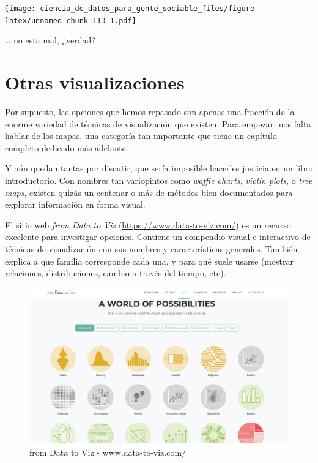 \documentclass[spanish,]{book}
\begin{document}
\texttt{[image: ciencia\_de\_datos\_para\_gente\_sociable\_files/figure-latex/unnamed-chunk-113-1.pdf]}

\ldots{} no esta mal, ¿verdad?

\hypertarget{otras-visualizaciones}{%
\section{Otras visualizaciones}\label{otras-visualizaciones}}

Por supuesto, las opciones que hemos repasado son apenas una fracción de la enorme variedad de técnicas de visualización que existen. Para empezar, nos falta hablar de los mapas, una categoría tan importante que tiene un capítulo completo dedicado más adelante.

Y aún quedan tantas por discutir, que sería imposible hacerles justicia en un libro introductorio. Con nombres tan variopintos como \emph{waffle charts}, \emph{violin plots}, o \emph{tree maps}, existen quizás un centenar o más de métodos bien documentados para explorar información en forma visual.

El sitio web \emph{from Data to Viz} (\url{https://www.data-to-viz.com/}) es un recurso excelente para investigar opciones. Contiene un compendio visual e interactivo de técnicas de visualización con sus nombres y características generales. También explica a que familia corresponde cada una, y para qué suele usarse (mostrar relaciones, distribuciones, cambio a través del tiempo, etc).

\begin{figure}
\includegraphics[width=1\linewidth]{imagenes/data_to_viz} \caption{from Data to Viz - www.data-to-viz.com/}\label{fig:unnamed-chunk-114}
\end{figure}
\end{document}

